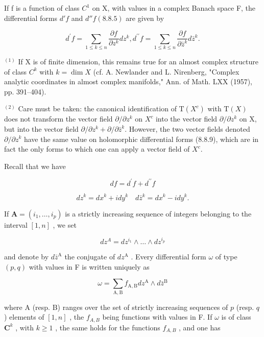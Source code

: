 If f is a function of class \(C^{1}\) on X, with values in a complex Banach space F, the differential forms \(d'f\) and \(d''f(8.8.5)\) are given by

\[
d ^ {\prime} f = \sum_ {1 \leqslant k \leqslant n} \frac {\partial f}{\partial z ^ {k}} d z ^ {k}, d ^ {\prime \prime} f = \sum_ {1 \leqslant k \leqslant n} \frac {\partial f}{\partial \bar {z} ^ {k}} d \bar {z} ^ {k}.\tag{10}
\]

\(^{(1)}\) If X is of finite dimension, this remains true for an almost complex structure of class \(C^k\) with \(k = \dim X\) (cf. A. Newlander and L. Nirenberg, "Complex analytic coordinates in almost complex manifolds," Ann. of Math. LXX (1957), pp. 391--404).

\(^{(2)}\) Care must be taken: the canonical identification of \(\mathrm{T}(X^c)\) with \(\mathrm{T}(X)\) does not transform the vector field \(\partial/\partial z^k\) on \(X^c\) into the vector field \(\partial/\partial z^k\) on X, but into the vector field \(\partial/\partial z^k+\partial/\partial\bar z^k\). However, the two vector fields denoted \(\partial/\partial z^k\) have the same value on holomorphic differential forms (8.8.9), which are in fact the only forms to which one can apply a vector field of \(X^c\).

Recall that we have

\[
d f = d ^ {\prime} f + d ^ {\prime \prime} f
\]

\[
d z ^ {k} = d x ^ {k} + i d y ^ {k} \quad d \bar {z} ^ {k} = d x ^ {k} - i d y ^ {k}.
\]

If \(\mathbf{A}=(i_{1},\ldots,i_{p})\) is a strictly increasing sequence of integers belonging to the interval \([1,n]\) , we set

\[
d z ^ {A} = d z ^ {i _ {1}} \wedge \dots \wedge d z ^ {i _ {p}}
\]

and denote by \(d\bar{z}^{\mathrm{A}}\) the conjugate of \(dz^{\mathrm{A}}\) . Every differential form \(\omega\) of type \((p,q)\) with values in F is written uniquely as

\[
\omega = \sum_ {\mathrm{A}, \mathrm{B}} f _ {\mathrm{A}, \mathrm{B}} d z ^ {\mathrm{A}} \wedge d \bar {z} ^ {\mathrm{B}}\tag{11}
\]

where A (resp. B) ranges over the set of strictly increasing sequences of \(p\) (resp. \(q\) ) elements of \([1, n]\) , the \(f_{A,B}\) being functions with values in F. If \(\omega\) is of class \(\mathbf{C}^k\) , with \(k \geqslant 1\) , the same holds for the functions \(f_{A,B}\) , and one has

